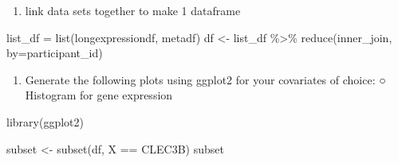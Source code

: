 \documentclass[
]{article}
\newenvironment{Shaded}{\begin{snugshade}}{\end{snugshade}}
\newcommand{\AttributeTok}[1]{\textcolor[rgb]{0.77,0.63,0.00}{#1}}
\newcommand{\FunctionTok}[1]{\textcolor[rgb]{0.00,0.00,0.00}{#1}}
\newcommand{\NormalTok}[1]{#1}
\newcommand{\OtherTok}[1]{\textcolor[rgb]{0.56,0.35,0.01}{#1}}
\newcommand{\SpecialCharTok}[1]{\textcolor[rgb]{0.00,0.00,0.00}{#1}}
\newcommand{\StringTok}[1]{\textcolor[rgb]{0.31,0.60,0.02}{#1}}
\providecommand{\tightlist}{%
  \setlength{\itemsep}{0pt}\setlength{\parskip}{0pt}}
\begin{document}
\begin{enumerate}
\def\labelenumi{\arabic{enumi}.}
\setcounter{enumi}{1}
\tightlist
\item
  link data sets together to make 1 dataframe
\end{enumerate}

\begin{Shaded}
\begin{Highlighting}[]
\NormalTok{list\_df }\OtherTok{=} \FunctionTok{list}\NormalTok{(longexpressiondf, metadf)}
\NormalTok{df }\OtherTok{\textless{}{-}}\NormalTok{ list\_df }\SpecialCharTok{\%\textgreater{}\%} \FunctionTok{reduce}\NormalTok{(inner\_join, }\AttributeTok{by=}\StringTok{\textquotesingle{}participant\_id\textquotesingle{}}\NormalTok{)}
\end{Highlighting}
\end{Shaded}

\begin{enumerate}
\def\labelenumi{\arabic{enumi}.}
\setcounter{enumi}{2}
\tightlist
\item
  Generate the following plots using ggplot2 for your covariates of
  choice: ○ Histogram for gene expression
\end{enumerate}

\begin{Shaded}
\begin{Highlighting}[]
\FunctionTok{library}\NormalTok{(ggplot2)}

\NormalTok{subset }\OtherTok{\textless{}{-}} \FunctionTok{subset}\NormalTok{(df, X }\SpecialCharTok{==} \StringTok{\textquotesingle{}CLEC3B\textquotesingle{}}\NormalTok{)}
\NormalTok{subset}
\end{Highlighting}
\end{Shaded}
\end{document}
